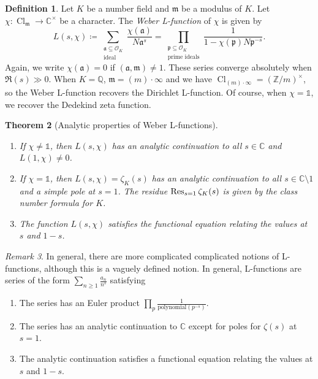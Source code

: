 \documentclass[leqno, openany]{memoir}
\newtheorem{thm}{Theorem}[section]
\theoremstyle{definition}
\newtheorem{defn}[thm]{Definition}
\theoremstyle{remark}
\newtheorem{rmk}[thm]{Remark}
\theoremstyle{plain}
\theoremstyle{definition}
\theoremstyle{remark}
\newcommand{\C}{\mathbb{C}}
\newcommand{\Z}{\mathbb{Z}}
\newcommand{\Q}{\mathbb{Q}}
\newcommand{\mc}[1]{\mathcal{#1}}
\newcommand{\mf}[1]{\mathfrak{#1}}
\DeclareMathOperator{\Cl}{Cl}
\begin{document}
\begin{defn}
    Let $K$ be a number field and $\mf{m}$ be a modulus of $K$. Let $\chi \colon \Cl_{\mf{m}} \to \C^{\times}$ be a character. The \textit{Weber L-function} of $\chi$ is given by
    \[ L(s, \chi) \coloneqq \sum_{\substack{\mf{a} \subseteq \mc{O}_K \\ \text{ideal}}} \frac{\chi(\mf{a})}{N\mf{a}^s} = \prod_{\substack{\mf{p} \subseteq \mc{O}_K \\ \text{prime ideals}}} \frac{1}{1-\chi(\mf{p})N\mf{p}^{-s}}. \]
    Again, we write $\chi(\mf{a}) = 0$ if $(\mf{a}, \mf{m}) \neq 1$. These series converge absolutely when $\Re(s) \gg 0$. When $K = \Q$, $\mf{m} = (m) \cdot \infty$ and we have $\Cl_{(m) \cdot \infty} = {(\Z/m)}^{\times}$, so the Weber L-function recovers the Dirichlet L-function. Of course, when $\chi = \mathbb{1}$, we recover the Dedekind zeta function.
\end{defn}

\begin{thm}[Analytic properties of Weber L-functions]\leavevmode
    \begin{enumerate}
        \item If $\chi \neq \mathbb{1}$, then $L(s, \chi)$ has an analytic continuation to all $s \in \C$ and $L(1, \chi) \neq 0$.
        \item If $\chi = \mathbb{1}$, then $L(s, \chi) = \zeta_K(s)$ has an analytic continuation to all $s \in \C \setminus \qty{1}$ and a simple pole at $s = 1$. The residue $\Res_{s=1} \zeta_K(s)$ is given by the class number formula for $K$.
        \item The function $L(s,\chi)$ satisfies the functional equation relating the values at $s$ and $1-s$.
    \end{enumerate}
\end{thm}

\begin{rmk}
    In general, there are more complicated complicated notions of L-functions, although this is a vaguely defined notion. In general, L-functions are series of the form $\sum_{n \geq 1} \frac{a_n}{n^s}$ satisfying
    \begin{enumerate}
        \item The series has an Euler product $\prod_p \frac{1}{\text{polynomial}(p^{-s})}$.
        \item The series has an analytic continuation to $\C$ except for poles for $\zeta(s)$ at $s = 1$.
        \item The analytic continuation satisfies a functional equation relating the values at $s$ and $1-s$.
    \end{enumerate}
\end{rmk}
\end{document}
